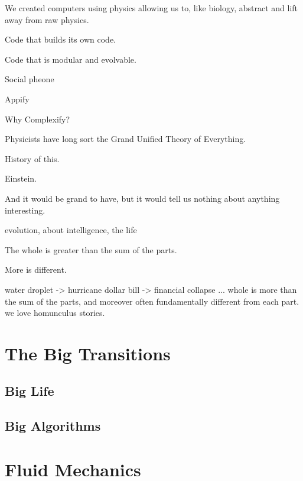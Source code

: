 We created computers using physics allowing us to, like biology,
abstract and lift away from raw physics.


\usepackage{lipsum}
\usepackage[framemethod=default]{mdframed}




\begin{myframe}
\lipsum[1]
\end{myframe}




Code that builds its own code.

Code that is modular and evolvable.

Social pheone


Appify


Why Complexify?


Physicists have
long sort the Grand Unified Theory of Everything.

History of this.

Einstein.

And it would be grand to have, but it would
tell us nothing about anything interesting.

evolution, about intelligence,
the life

The whole is greater than the sum of the parts.

More is different.



water droplet -> hurricane
dollar bill -> financial collapse 
...
whole is more than the sum of the parts,
and moreover often fundamentally different from each part.
we love homunculus stories.

\section{The Big Transitions}

\subsection{Big Life}

\subsection{Big Algorithms}

\section{Fluid Mechanics}

